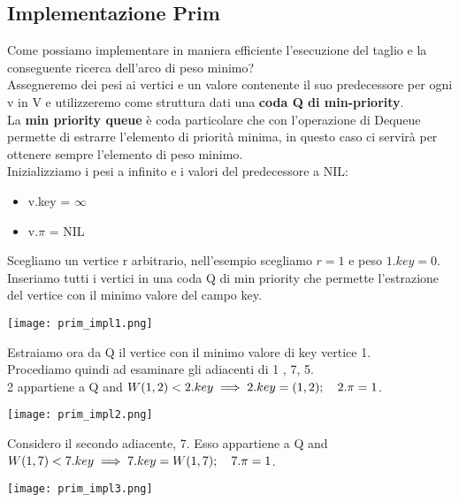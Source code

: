 \subsection{Implementazione Prim}
Come possiamo implementare in maniera efficiente l'esecuzione del taglio e la
conseguente ricerca dell'arco di peso minimo?\\
Assegneremo dei pesi ai vertici e un valore contenente il suo predecessore per ogni v in V e utilizzeremo
come struttura dati una \textbf{coda Q di min-priority}.\\
La \textbf{min priority queue} è coda particolare che con l'operazione di Dequeue permette
di estrarre l'elemento di priorità minima, in questo caso ci servirà per ottenere sempre l'elemento
di peso minimo.\\
Inizializziamo i pesi a infinito e i valori del predecessore a NIL:
\begin{itemize}
    \item v.key = $\infty$
    \item v.$\pi$ = NIL
\end{itemize}
Scegliamo un vertice r arbitrario, nell'esempio scegliamo $r = 1$ e peso $1.key = 0$.\\
Inseriamo tutti i vertici in una coda Q di min priority che permette l'estrazione 
del vertice con il minimo valore del campo key.
\begin{center}
    \texttt{[image: prim\_impl1.png]}
\end{center}
Estraiamo ora da Q il vertice con il minimo valore di key \ra vertice 1.\\
Procediamo quindi ad esaminare gli adiacenti di 1 , 7, 5.\\
2 appartiene a Q and $W(1,2) < 2.key \\ \implies 2.key = (1,2);\quad 2.\pi = 1$.
\begin{center}
    \texttt{[image: prim\_impl2.png]}
\end{center}
Considero il secondo adiacente, 7. Esso appartiene a Q and $W(1,7) < 7.key \\
\implies 7.key = W(1,7);\quad 7.\pi = 1$.
\begin{center}
    \texttt{[image: prim\_impl3.png]}
\end{center}
